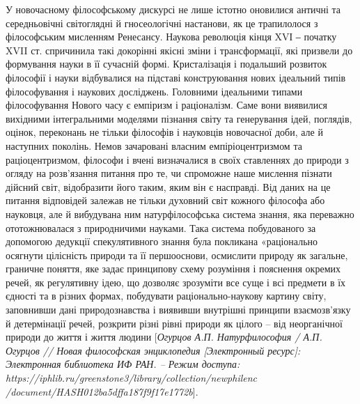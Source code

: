 У новочасному філософському дискурсі не лише істотно оновилися античні
та середньовічні світоглядні й гносеологічні настанови, як це трапилолося з
філософським мисленням Ренесансу. Наукова революція кінця XVІ ‒ початку
XVII ст. спричинила такі докорінні якісні зміни і трансформації, які призвели
до формування науки в її сучасній формі. Кристалізація і подальший розвиток
філософії і науки відбувалися на підставі конструювання нових ідеальний типів
філософування і наукових досліджень. Головними ідеальними типами
філософування Нового часу є емпіризм і раціоналізм. Саме вони виявилися
вихідними інтегральними моделями пізнання світу та генерування ідей,
поглядів, оцінок, переконань не тільки філософів і науковців новочасної доби,
але й наступних поколінь. Немов зачаровані власним емпіріоцентризмом та
раціоцентризмом, філософи і вчені визначалися в своїх ставленнях до природи
з огляду на розв’язання питання про те, чи спроможне наше мислення пізнати
дійсний світ, відобразити його таким, яким він є насправді. Від даних на це
питання відповідей залежав не тільки духовний світ кожного філософа або
науковця, але й вибудувана ним натурфілософська система знання, яка
переважно ототожнювалася з природничими науками. Така система
побудованого за допомогою дедукції спекулятивного знання була покликана
«раціонально осягнути цілісність природи та її першооснови, осмислити
природу як загальне, граничне поняття, яке задає принципову схему розуміння і
пояснення окремих речей, як регулятивну ідею, що дозволяє зрозуміти все суще
і всі предмети в їх єдності та в різних формах, побудувати раціонально-наукову
картину світу, заповнивши дані природознавства і виявивши внутрішні
принципи взаємозв’язку й детермінації речей, розкрити різні рівні природи як
цілого – від неорганічної природи до життя і життя людини [\textit{Огурцов А.П.
Натурфилософия / А.П. Огурцов // Новая философская энциклопедия
[Электронный ресурс]: Электронная библиотека ИФ РАН. – Режим доступа:
https://iphlib.ru/greenstone3/library/collection/newphilenc /document/HASH012ba5dffa187f9f17e1772b}].

